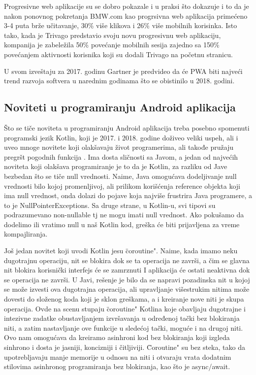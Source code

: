 \documentclass[a4paper]{article}
\begin{document}
Progresivne web aplikacije su se dobro pokazale i u praksi što dokazuje i to da je nakon ponovnog pokretanja BMW.com kao progrsivna web aplikacija primećeno 3-4 puta brže učitavanje, 30\% više klikova i 26\% više mobilnih korisinka. Isto tako, kada je Trivago predstavio svoju novu progresivnu web aplikaciju, kompanija je zabeležila 50\% povećanje mobilnih sesija zajedno sa 150\% povećanjem aktivnosti korisnika koji su dodali Trivago na početnu stranicu. 

U svom izveštaju za 2017. godinu Gartner je predvideo da će PWA biti najveći trend razvoja softvera u narednim godinama što se obistinilo u 2018. godini.

\subsection{Noviteti u programiranju Android aplikacija}
\label{subsec:noviteti u programiranju Andriod aplikacija}

Što se tiče noviteta u programiranju Android aplikacija treba posebno spomenuti programski jezik Kotlin, koji je 2017. i 2018. godine doživeo veliki uspeh, ali i uveo mnoge novitete koji olakšavaju život programerima, ali takođe pružaju pregršt pogodnih funkcija \cite{kotlin}. Ima dosta sličnosti sa Javom, a jedan od najvećih noviteta koji olakšava programiranje je to da je Kotlin, za razliku od Jave bezbedan što se tiče null vrednosti. Naime, Java omogućava dodeljivanje null vrednosti bilo kojoj promenljivoj, ali prilikom korišćenja reference objekta koji ima null vrednost, onda dolazi do pojave koja najviše frustrira Java programere, a to je NullPointerExceptions. Sa druge strane, u Kotlin-u, svi tipovi su podrazumevano non-nullable tj ne mogu imati null vrednost. Ako pokušamo da dodelimo ili vratimo null u naš Kotlin kod, greška će biti prijavljena za vreme kompajliranja.

Još jedan novitet koji uvodi Kotlin jesu \"coroutine". Naime, kada imamo neku dugotrajnu operaciju, nit se blokira dok se ta operacija ne završi, a čim se glavna nit blokira korisnički interfejs će se zamrznuti I aplikacija će ostati neaktivna dok se operacija ne završi. U Javi, rešenje je bilo da se napravi pozadinska nit u kojoj se može izvesti ova dugotrajna operacija, ali upravljanje višestrukim nitima može dovesti do složenog koda koji je sklon greškama, a i kreiranje nove niti je skupa operacija. Ovde na scenu stupaju \"coroutine" Kotlina koje obavljaju dugotrajne i intezivne zadatke obustavljanjem izvršavanja u određenoj tački bez blokiranja niti, a zatim nastavljanje ove funkcije u sledećoj tački, moguće i na drugoj niti. Ovo nam omogućava da kreiramo asinhroni kod bez blokiranja koji izgleda sinhrono i dosta je jasniji, koncizniji i čitljiviji. \"Coroutine" su bez steka, tako da upotrebljavaju manje memorije u odnosu na niti i otvaraju vrata dodatnim stilovima asinhronog programiranja bez blokiranja, kao što je async/await.
\end{document}
